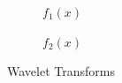 \documentclass[12pt]{article}
\begin{document}
\begin{figure}
  \centering

  \begin{subfigure}[b]{0.85\textwidth}
    \caption{$f_1(x)$}
  \end{subfigure}
  \qquad
  \begin{subfigure}[b]{0.85\textwidth}
    \caption{$f_2(x)$}
  \end{subfigure}

  \caption{Wavelet Transforms}
  \label{wt}

\end{figure}
\end{document}
